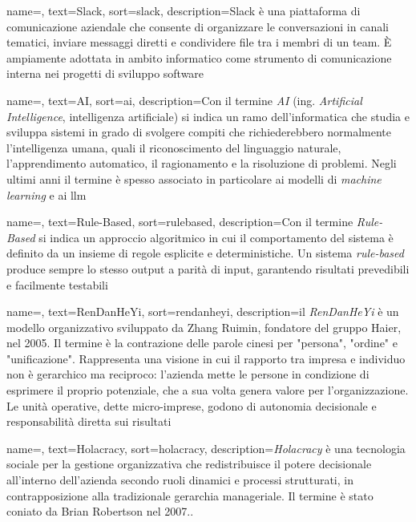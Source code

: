  {
    name=,
    text=Slack,
    sort=slack,
    description={Slack è una piattaforma di comunicazione aziendale che consente di organizzare le conversazioni in canali tematici, inviare messaggi diretti e condividere file tra i membri di un team. È ampiamente adottata in ambito informatico come strumento di comunicazione interna nei progetti di sviluppo software}
}

 {
    name=,
    text=AI,
    sort=ai,
    description={Con il termine \emph{AI} (ing. \emph{Artificial Intelligence}, intelligenza artificiale) si indica un ramo dell'informatica che studia e sviluppa sistemi in grado di svolgere compiti che richiederebbero normalmente l'intelligenza umana, quali il riconoscimento del linguaggio naturale, l'apprendimento automatico, il ragionamento e la risoluzione di problemi. Negli ultimi anni il termine è spesso associato in particolare ai modelli di \emph{machine learning} e ai \gls{llm}}
}

 {
    name=,
    text=Rule-Based,
    sort=rulebased,
    description={Con il termine \emph{Rule-Based} si indica un approccio algoritmico in cui il comportamento del sistema è definito da un insieme di regole esplicite e deterministiche. Un sistema \emph{rule-based} produce sempre lo stesso output a parità di input, garantendo risultati prevedibili e facilmente testabili}
}

 {
    name=,
    text=RenDanHeYi,
    sort=rendanheyi,
    description={il \emph{RenDanHeYi} è un modello organizzativo sviluppato da Zhang Ruimin, fondatore del gruppo Haier, nel 2005. Il termine è la contrazione delle parole cinesi per "persona", "ordine" e "unificazione". Rappresenta una visione in cui il rapporto tra impresa e individuo non è gerarchico ma reciproco: l'azienda mette le persone in condizione di esprimere il proprio potenziale, che a sua volta genera valore per l'organizzazione. Le unità operative, dette micro-imprese, godono di autonomia decisionale e responsabilità diretta sui risultati}
}

 {
    name=,
    text=Holacracy,
    sort=holacracy,
    description={\emph{Holacracy} è una tecnologia sociale per la gestione organizzativa che redistribuisce il potere decisionale all'interno dell'azienda secondo ruoli dinamici e processi strutturati, in contrapposizione alla tradizionale gerarchia manageriale. Il termine è stato coniato da Brian Robertson nel 2007..}
}

